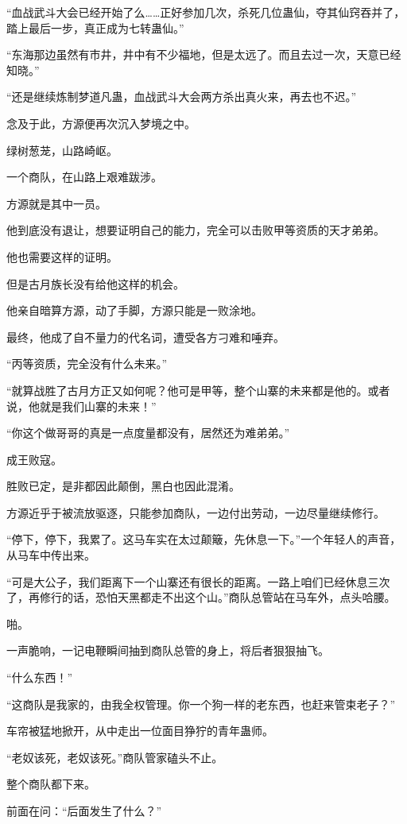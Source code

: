 \begin{this_body}
“血战武斗大会已经开始了么……正好参加几次，杀死几位蛊仙，夺其仙窍吞并了，踏上最后一步，真正成为七转蛊仙。”

“东海那边虽然有市井，井中有不少福地，但是太远了。而且去过一次，天意已经知晓。”

“还是继续炼制梦道凡蛊，血战武斗大会两方杀出真火来，再去也不迟。”

念及于此，方源便再次沉入梦境之中。

绿树葱茏，山路崎岖。

一个商队，在山路上艰难跋涉。

方源就是其中一员。

他到底没有退让，想要证明自己的能力，完全可以击败甲等资质的天才弟弟。

他也需要这样的证明。

但是古月族长没有给他这样的机会。

他亲自暗算方源，动了手脚，方源只能是一败涂地。

最终，他成了自不量力的代名词，遭受各方刁难和唾弃。

“丙等资质，完全没有什么未来。”

“就算战胜了古月方正又如何呢？他可是甲等，整个山寨的未来都是他的。或者说，他就是我们山寨的未来！”

“你这个做哥哥的真是一点度量都没有，居然还为难弟弟。”

成王败寇。

胜败已定，是非都因此颠倒，黑白也因此混淆。

方源近乎于被流放驱逐，只能参加商队，一边付出劳动，一边尽量继续修行。

“停下，停下，我累了。这马车实在太过颠簸，先休息一下。”一个年轻人的声音，从马车中传出来。

“可是大公子，我们距离下一个山寨还有很长的距离。一路上咱们已经休息三次了，再修行的话，恐怕天黑都走不出这个山。”商队总管站在马车外，点头哈腰。

啪。

一声脆响，一记电鞭瞬间抽到商队总管的身上，将后者狠狠抽飞。

“什么东西！”

“这商队是我家的，由我全权管理。你一个狗一样的老东西，也赶来管束老子？”

车帘被猛地掀开，从中走出一位面目狰狞的青年蛊师。

“老奴该死，老奴该死。”商队管家磕头不止。

整个商队都下来。

前面在问：“后面发生了什么？”


\end{this_body}
